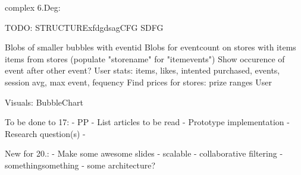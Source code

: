     complex 6.Deg:

TODO: STRUCTURExfdgdsagCFG
SDFG

    Blobs of smaller bubbles with eventid
    Blobs for eventcount on stores with items items from stores (populate "storename" for "itemevents")
    Show occurence of event after other event?
    User stats: items, likes, intented purchased, events, session avg, max event, fequency
    Find prices for stores: prize ranges
    User

Visuals:
    BubbleChart

To be done to 17:
    - PP
    - List articles to be read
    - Prototype implementation
    - Research question(s)
    -

New for 20.:
    - Make some awesome slides
    - scalable
    - collaborative filtering
    - somethingsomething
    - some architecture?
